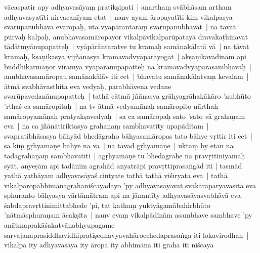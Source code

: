 \documentclass[article,12pt,a4paper]{memoir}%
\newcommand{\persName}[1]{#1}
\newcounter{parCount}
\begin{document}
	  \pstart \leavevmode%
	\label{thakur75-135.16}\persName{vācaspatir} apy adhyavasāyaṃ pratikṣipati | \label{quote-nk-adhyavasāya-start} anarthaṃ svābhāsam artham adhyavasyatīti nirvacanīyam etat | nanv ayam āropayatīti kiṃ vikalpasya svarūpānubhava evāropaḥ, uta vyāpārāntaraṃ svarūpānubhavāt | na tāvat pūrvaḥ kalpaḥ, anubhavasamāropayor vikalpāvikalparūpatayā dravakaṭhinavat tādātmyānupapatteḥ | vyāpārāntaratve tu kramaḥ samānakālatā vā | na tāvat kramaḥ, kṣaṇikasya vijñānasya kramavadvyāpārāyogāt | akṣaṇikavādinām api buddhikarmaṇor viramya vyāpārānupapatteḥ na kramavadvyāpārasambhavaḥ | anubhavasamāropau samānakālāv iti cet | bhavatu samānakālatvaṃ kevalam | ātmā svabhāvasthita eva vedyaḥ, parabhāvena vedane svarūpavedanānupapatteḥ | tathā cātmā jñānasya grāhyagrāhakākāro 'nubhūto 'rthaś ca samāropitaḥ | na tv ātmā vedyamānaḥ samāropito nārthaḥ samāropyamāṇaḥ pratyakṣavedyaḥ | sa ca samāropaḥ sato 'sato vā grahaṇam eva | na ca jñānātiriktasya grahaṇaṃ sambhavatīty upapāditam |\label{thakur75-135.27} svapratibhāsasya bāhyād bhedāgraho bāhyasamāropas tato bāhye vṛttir iti cet | sa kiṃ gṛhyamāṇe bāhye na vā | na tāvad gṛhyamāṇe | uktaṃ hy etan na \label{ratnakīrtinibandhāvali__36r1PF7IMS9V2FE679H8QDDC4HL}tadagrahaṇaṃ\label{ratnakīrtinibandhāvali__36r1PF7IMS7TSIJTA6L3F390OH3} sambhavatīti | agṛhyamāṇe tu bhedāgrahe na pravṛttiniyamaḥ syāt, anyeṣām api tadānīm agrahād anyatrāpi pravṛttiprasaṅgād iti \label{quote-nk-adhyavasāya-end}| tasmād yathā yathāyam adhyavasāyaś cintyate tathā tathā viśīryata eva | tathā vikalpāropābhimānagrahaniścayādayo 'py adhyavasāyavat svākāraparyavasitā eva sphuranto bāhyasya vārtāmātram api na jānantīty adhyavasāyasvabhāvā eva \label{ratnakīrtinibandhāvali__36r1PF7IMS5TO6HY4RVSXOVCLO1}śabdapravṛttinimittabhede\label{ratnakīrtinibandhāvali__36r1PF7IMS3RQL7PXXLRXDJR361} 'pi, tat kathaṃ yuktyāgamābahirbhūto 'nātmāsphuraṇam ācakṣīta | \label{thakur75-136.3} nanv evaṃ vikalpādīnām asambhave sambhave 'py anātmaprakāśakatvānabhyupagame sarvajanaprasiddhavidhipratiṣedhavyavahārocchedaprasaṅga iti lokavirodhaḥ | vikalpa ity adhyavasāya ity āropa ity abhimāna iti graha iti niścaya 
\end{document}
